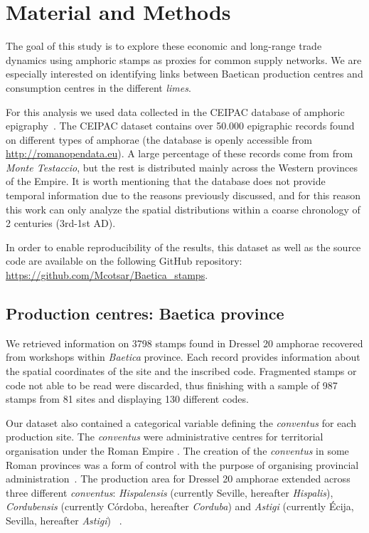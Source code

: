 \section{Material and Methods}
\label{sec:5}

The goal of this study is to explore these economic and long-range trade dynamics using amphoric stamps as proxies for common supply networks. We are especially interested on identifying links between Baetican production centres and consumption centres in the different \textit{limes}. 

For this analysis we used data collected in the CEIPAC database of amphoric epigraphy~\citep{remesal_centro_2015}. The CEIPAC dataset contains over 50.000 epigraphic records found on different types of amphorae (the database is openly accessible from \url{http://romanopendata.eu}). A large percentage of these records come from from \textit{Monte Testaccio}, but the rest is distributed mainly across the Western provinces of the Empire. It is worth mentioning that the database does not provide temporal information due to the reasons previously discussed, and for this reason this work can only analyze the spatial distributions within a coarse chronology of 2 centuries (3rd-1st AD).

In order to enable reproducibility of the results, this dataset as well as the source code are available on the following GitHub repository: \url{https://github.com/Mcotsar/Baetica\_stamps}.

\subsection{Production centres: Baetica province}
\label{sec:5}

We retrieved information on 3798 stamps found in Dressel 20 amphorae recovered from workshops within \textit{Baetica} province. Each record provides information about the spatial coordinates of the site and the inscribed code. Fragmented stamps or code not able to be read were discarded, thus finishing with a sample of 987 stamps from 81 sites and displaying 130 different codes.

Our dataset also contained a categorical variable defining the \textit{conventus} for each production site. The \textit{conventus} were administrative centres for territorial organisation under the Roman Empire \citep[58]{ozcariz_gil_administracion_2013}. The creation of the \textit{conventus} in some Roman provinces was a form of control with the purpose of organising provincial administration~\citep{albertini_les_1923}. The production area for Dressel 20 amphorae extended across three different \textit{conventus}: \textit{Hispalensis} (currently Seville, hereafter \textit{Hispalis}), \textit{Cordubensis} (currently C\'ordoba, hereafter \textit{Corduba}) and \textit{Astigi} (currently \'Ecija, Sevilla, hereafter \textit{Astigi})~\citep{rodriguez_economioleicola_1977,chicdatos2001,berni_millet_epigrafianforica_2008} . 

